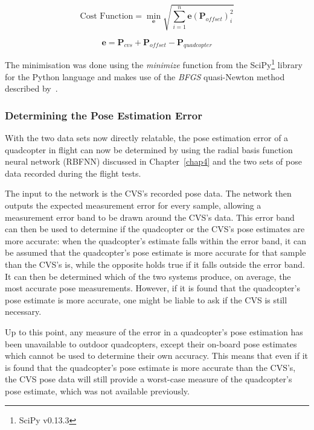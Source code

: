 \begin{equation}
  \label{eq:chap5-err-func}
  \text{Cost Function} = \min_{\bm{e}}\sqrt{\displaystyle\sum_{i=1}^{n} \bm{e}(\bm{P}_{of\!fset})_i^2}
\end{equation}

\begin{equation}
  \label{eq:chap5-err-term}
  \bm{e} = \bm{P}_{cvs} + \bm{P}_{of\!fset} - \bm{P}_{quadcopter}
\end{equation}

The minimisation was done using the \emph{minimize} function from the SciPy\footnote{SciPy v0.13.3} library for the Python language and makes use of the \emph{BFGS} quasi-Newton method described by~\cite{nocedal2006numerical}. 

\subsubsection{Determining the Pose Estimation Error}

With the two data sets now directly relatable, the pose estimation error of a quadcopter in flight can now be determined by using the radial basis function neural network (RBFNN) discussed in Chapter~\ref{chap4} and the two sets of pose data recorded during the flight tests.  

The input to the network is the CVS's recorded pose data. The network then outputs the expected measurement error for every sample, allowing a measurement error band to be drawn around the CVS's data. This error band can then be used to determine if the quadcopter or the CVS's pose estimates are more accurate: when the quadcopter's estimate falls within the error band, it can be assumed that the quadcopter's pose estimate is more accurate for that sample than the CVS's is, while the opposite holds true if it falls outside the error band. It can then be determined which of the two systems produce, on average, the most accurate pose measurements. However, if it is found that the quadcopter's pose estimate is more accurate, one might be liable to ask if the CVS is still necessary.

Up to this point, any measure of the error in a quadcopter's pose estimation has been unavailable to outdoor quadcopters, except their on-board pose estimates which cannot be used to determine their own accuracy. This means that even if it is found that the quadcopter's pose estimate is more accurate than the CVS's, the CVS pose data will still provide a worst-case measure of the quadcopter's pose estimate, which was not available previously. 

